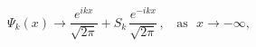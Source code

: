 \begin{equation}\label{Psi-}
\Psi_k(x)\rightarrow \frac{e^{ikx}}{\sqrt{2\pi}}+
S_k\,\frac{e^{-ikx}}{\sqrt{2\pi}}\,,~~~~\mbox{as}~~~x\rightarrow -\infty,
\end{equation}

